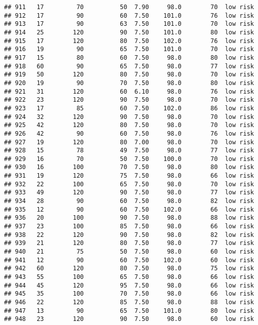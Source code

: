 \documentclass[
  ignorenonframetext,
]{beamer}
\begin{document}
\begin{frame}[fragile]
\begin{verbatim}
## 911   17         70          50  7.90     98.0        70  low risk
## 912   17         90          60  7.50    101.0        76  low risk
## 913   17         90          63  7.50    101.0        70  low risk
## 914   25        120          90  7.50    101.0        80  low risk
## 915   17        120          80  7.50    102.0        76  low risk
## 916   19         90          65  7.50    101.0        70  low risk
## 917   15         80          60  7.50     98.0        80  low risk
## 918   60         90          65  7.50     98.0        77  low risk
## 919   50        120          80  7.50     98.0        70  low risk
## 920   19         90          70  7.50     98.0        80  low risk
## 921   31        120          60  6.10     98.0        76  low risk
## 922   23        120          90  7.50     98.0        70  low risk
## 923   17         85          60  7.50    102.0        86  low risk
## 924   32        120          90  7.50     98.0        70  low risk
## 925   42        120          80  7.50     98.0        70  low risk
## 926   42         90          60  7.50     98.0        76  low risk
## 927   19        120          80  7.00     98.0        70  low risk
## 928   15         78          49  7.50     98.0        77  low risk
## 929   16         70          50  7.50    100.0        70  low risk
## 930   16        100          70  7.50     98.0        80  low risk
## 931   19        120          75  7.50     98.0        66  low risk
## 932   22        100          65  7.50     98.0        70  low risk
## 933   49        120          90  7.50     98.0        77  low risk
## 934   28         90          60  7.50     98.0        82  low risk
## 935   12         90          60  7.50    102.0        66  low risk
## 936   20        100          90  7.50     98.0        88  low risk
## 937   23        100          85  7.50     98.0        66  low risk
## 938   22        120          90  7.50     98.0        82  low risk
## 939   21        120          80  7.50     98.0        77  low risk
## 940   21         75          50  7.50     98.0        60  low risk
## 941   12         90          60  7.50    102.0        60  low risk
## 942   60        120          80  7.50     98.0        75  low risk
## 943   55        100          65  7.50     98.0        66  low risk
## 944   45        120          95  7.50     98.0        66  low risk
## 945   35        100          70  7.50     98.0        66  low risk
## 946   22        120          85  7.50     98.0        88  low risk
## 947   13         90          65  7.50    101.0        80  low risk
## 948   23        120          90  7.50     98.0        60  low risk

\end{verbatim}
\end{frame}
\end{document}
